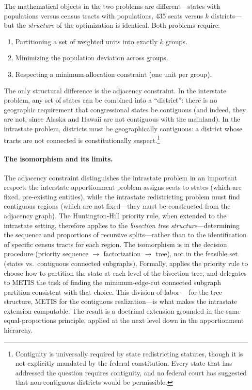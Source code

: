 The mathematical objects in the two problems are different---states with
populations versus census tracts with populations, 435 seats versus
$k$ districts---but the \emph{structure} of the optimization is identical.
Both problems require:
\begin{enumerate}
  \item Partitioning a set of weighted units into exactly $k$ groups.
  \item Minimizing the population deviation across groups.
  \item Respecting a minimum-allocation constraint (one unit per group).
\end{enumerate}

The only structural difference is the adjacency constraint.
In the interstate problem, any set of states can be combined into a
``district'': there is no geographic requirement that congressional
states be contiguous (and indeed, they are not, since Alaska and Hawaii
are not contiguous with the mainland).
In the intrastate problem, districts must be geographically contiguous:
a district whose tracts are not connected is constitutionally suspect.\footnote{%
  Contiguity is universally required by state redistricting statutes,
  though it is not explicitly mandated by the federal constitution.
  Every state that has addressed the question requires contiguity,
  and no federal court has suggested that non-contiguous districts
  would be permissible.
}

\paragraph{The isomorphism and its limits.}
The adjacency constraint distinguishes the intrastate problem in an important respect:
the interstate apportionment problem assigns seats to states (which are fixed, pre-existing
entities), while the intrastate redistricting problem must find contiguous regions
(which are not fixed---they must be constructed from the adjacency graph).
The Huntington-Hill priority rule, when extended to the intrastate setting, therefore
applies to the \emph{bisection tree structure}---determining the sequence and proportions
of recursive splits---rather than to the identification of specific census tracts for
each region.
The isomorphism is in the decision procedure (priority sequence $\to$ factorization $\to$ tree),
not in the feasible set (states vs.\ contiguous connected subgraphs).
Formally, \ar{} applies the \hh{} priority rule to choose how to partition the state at each
level of the bisection tree, and delegates to METIS the task of finding the minimum-edge-cut
connected subgraph partition consistent with that choice.
This division of labor---\hh{} for the tree structure, METIS for the contiguous realization---is
what makes the intrastate extension computable.
The result is a doctrinal extension grounded in the same equal-proportions principle,
applied at the next level down in the apportionment hierarchy.

